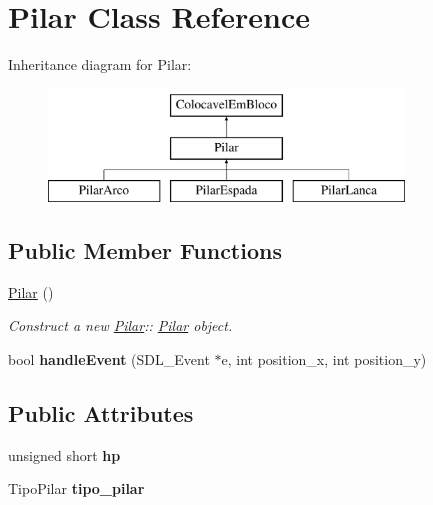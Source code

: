 \hypertarget{class_pilar}{}\section{Pilar Class Reference}
\label{class_pilar}
Inheritance diagram for Pilar\+:\begin{figure}[H]
\begin{center}
\leavevmode
\includegraphics[height=3.000000cm]{class_pilar}
\end{center}
\end{figure}
\subsection*{Public Member Functions}
\begin{DoxyCompactItemize}
\item 
\mbox{\label{class_pilar_a0a45a9e317ace22fda66c43b1987104d}} 
\mbox{\hyperlink{class_pilar_a0a45a9e317ace22fda66c43b1987104d}{Pilar}} ()
\begin{DoxyCompactList}\small\item\em Construct a new \mbox{\hyperlink{class_pilar}{Pilar}}\+:\+: \mbox{\hyperlink{class_pilar}{Pilar}} object. \end{DoxyCompactList}\item 
\mbox{\label{class_pilar_a75256cfabc394e62abe757acb86ddb76}} 
bool {\bfseries handle\+Event} (S\+D\+L\+\_\+\+Event $\ast$e, int position\+\_\+x, int position\+\_\+y)
\end{DoxyCompactItemize}
\subsection*{Public Attributes}
\begin{DoxyCompactItemize}
\item 
\mbox{\label{class_pilar_ad4148c5c8898c3e857d0140bdd362c84}} 
unsigned short {\bfseries hp}
\item 
\mbox{\label{class_pilar_a2c1911ab606a59529bc1dcedb27c986c}} 
Tipo\+Pilar {\bfseries tipo\+\_\+pilar}
\end{DoxyCompactItemize}


